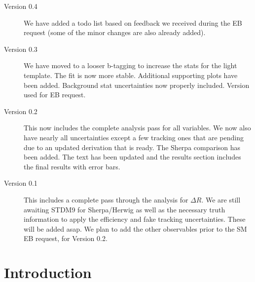 \documentclass[UKenglish,texlive=2013]{\ATLASLATEXPATH atlasdoc}
\begin{document}
\begin{description}
\item[Version 0.4] We have added a todo list based on feedback we received during the EB request (some of the minor changes are also already added).
\item[Version 0.3] We have moved to a looser b-tagging to increase the stats for the light template.  The fit is now more stable.  Additional supporting plots have been added.  Background stat uncertainties now properly included.  Version used for EB request.
\item[Version 0.2] This now includes the complete analysis pass for all variables.  We now also have nearly all uncertainties except a few tracking ones that are pending due to an updated derivation that is ready.  The Sherpa comparison has been added.  The text has been updated and the results section includes the final results with error bars.
\item[Version 0.1] This includes a complete pass through the analysis for $\Delta R$. We are still awaiting STDM9 for Sherpa/Herwig as well as the necessary truth information to apply the efficiency and fake tracking uncertainties.  These will be added asap.  We plan to add the other observables prior to the SM EB request, for Version 0.2.
\end{description}




\clearpage

\section{Introduction}
\label{sec:intro}


\clearpage
\end{document}
